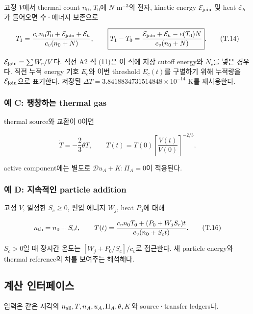 \documentclass[11pt,a4paper]{article}
\begin{document}
고정 \(V\)에서 thermal count \(n_0\), \(T_0\)에 \(N\) m\(^{-3}\)의 전자, kinetic energy \(\mathcal E_{\rm join}\) 및 heat \(\mathcal E_h\)가 들어오면 수·에너지 보존으로

\[
T_1=\frac{c_vn_0T_0+\mathcal E_{\rm join}+\mathcal E_h}{c_v(n_0+N)},
\qquad
\boxed{T_1-T_0=
\frac{\mathcal E_{\rm join}+\mathcal E_h-e(T_0)N}{c_v(n_0+N)}}.
\tag{T.14}
\]

\(\mathcal E_{\rm join}=\sum W_r/V\)다. 직전 A2 식 (11)은 이 식에 저장 cutoff energy와 \(N_c\)를 넣은 경우다. 직전 누적 energy 기호 \(E_c\)와 이번 threshold \(E_c(t)\)를 구별하기 위해 누적량을 \(\mathcal E_{\rm join}\)으로 표기한다. 저장된 \(\Delta T=3.8418834731514848\times10^{-14}\) K를 재사용한다.

\hypertarget{uxc608-c-uxd33duxcc3duxd558uxb294-thermal-gas}{%
\subsubsection{예 C: 팽창하는 thermal gas}\label{uxc608-c-uxd33duxcc3duxd558uxb294-thermal-gas}}

thermal source와 교환이 0이면

\[
\dot T=-\frac23\theta T,\qquad
T(t)=T(0)\left[\frac{V(t)}{V(0)}\right]^{-2/3}.
\tag{T.15}
\]

active component에는 별도로 \(\mathcal D u_A+K:\Pi_A=0\)이 적용된다.

\hypertarget{uxc608-d-uxc9c0uxc18duxc801uxc778-particle-addition}{%
\subsubsection{예 D: 지속적인 particle addition}\label{uxc608-d-uxc9c0uxc18duxc801uxc778-particle-addition}}

고정 \(V\), 일정한 \(S_c\ge0\), 편입 에너지 \(W_j\), heat \(P_0\)에 대해

\[
n_{\rm th}=n_0+S_ct,\qquad
T(t)=\frac{c_vn_0T_0+(P_0+W_jS_c)t}{c_v(n_0+S_ct)}.
\tag{T.16}
\]

\(S_c>0\)일 때 장시간 온도는 \([W_j+P_0/S_c]/c_v\)로 접근한다. 새 particle energy와 thermal reference의 차를 보여주는 해석해다.

\hypertarget{uxacc4uxc0b0-uxc778uxd130uxd398uxc774uxc2a4}{%
\subsection{계산 인터페이스}\label{uxacc4uxc0b0-uxc778uxd130uxd398uxc774uxc2a4}}

입력은 같은 시각의 \(n_{\rm all},T,n_A,u_A,\Pi_A,\theta,K\)와 source·transfer ledgers다.
\end{document}
